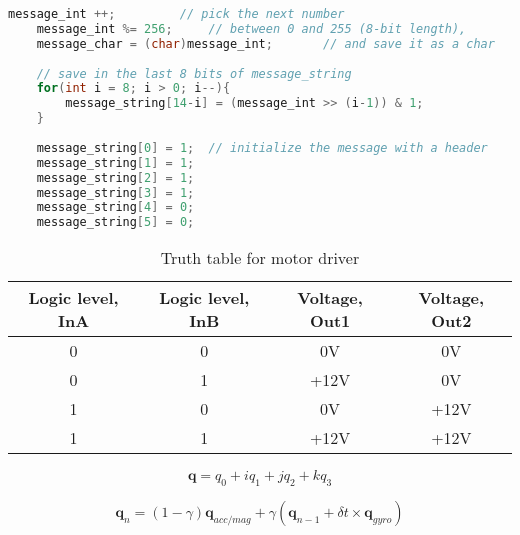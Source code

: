 \documentclass[12pt,a4paper]{report}
\begin{document}
\begin{lstlisting}[language=C++]
	message_int ++;			// pick the next number
	message_int %= 256;		// between 0 and 255 (8-bit length),
	message_char = (char)message_int;		// and save it as a char
	
	// save in the last 8 bits of message_string
	for(int i = 8; i > 0; i--){				
		message_string[14-i] = (message_int >> (i-1)) & 1;
	}
	
	message_string[0] = 1; 	// initialize the message with a header
	message_string[1] = 1;
	message_string[2] = 1;
	message_string[3] = 1;
	message_string[4] = 0;
	message_string[5] = 0;
\end{lstlisting}

\begin{table}[htbp]
	\centering
	\caption{Truth table for motor driver}
	\label{tab:truth}
	\begin{tabular}{|c|c|c|c|}
		\hline
		Logic level, InA & Logic level, InB & Voltage, Out1 & Voltage, Out2 \\
		\hline
		0 & 0 & 0V & 0V \\
		\hline
		0 & 1 & +12V & 0V \\
		\hline
		1 & 0 & 0V & +12V \\
		\hline
		1 & 1 & +12V & +12V \\
		\hline
	\end{tabular}
\end{table}

\begin{equation} \label{eq:3eq4}
	\mathbf{q} = q_0 + iq_1 + jq_2 + kq_3
\end{equation}

\begin{equation} \label{eq:3e4q4}
	\mathbf{q}_n = (1 - \gamma) \mathbf{q}_{acc/mag} + \gamma (\mathbf{q}_{n-1} + \delta t \times \mathbf{q}_{gyro})
\end{equation}
\end{document}
